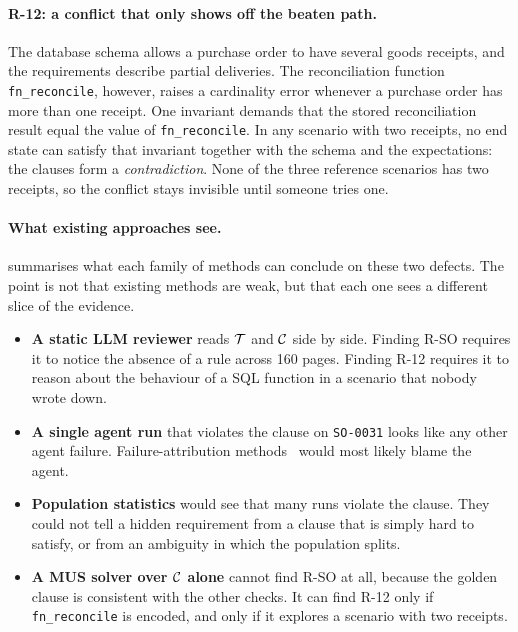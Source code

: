 \paragraph{R-12: a conflict that only shows off the beaten path.}
The database schema allows a purchase order to have several goods receipts, and the requirements describe partial deliveries. The reconciliation function \texttt{fn\_reconcile}, however, raises a cardinality error whenever a purchase order has more than one receipt. One invariant demands that the stored reconciliation result equal the value of \texttt{fn\_reconcile}. In any scenario with two receipts, no end state can satisfy that invariant together with the schema and the expectations: the clauses form a \emph{contradiction}. None of the three reference scenarios has two receipts, so the conflict stays invisible until someone tries one.

\paragraph{What existing approaches see.}
 summarises what each family of methods can conclude on these two defects. The point is not that existing methods are weak, but that each one sees a different slice of the evidence.
\begin{itemize}[leftmargin=*]
\item \textbf{A static LLM reviewer} reads $\mathcal{T}$ and $\mathcal{C}$ side by side. Finding R-SO requires it to notice the absence of a rule across 160 pages. Finding R-12 requires it to reason about the behaviour of a SQL function in a scenario that nobody wrote down.
\item \textbf{A single agent run} that violates the clause on \texttt{SO-0031} looks like any other agent failure. Failure-attribution methods~\cite{zhang2025which} would most likely blame the agent.
\item \textbf{Population statistics} would see that many runs violate the clause. They could not tell a hidden requirement from a clause that is simply hard to satisfy, or from an ambiguity in which the population splits.
\item \textbf{A MUS solver over $\mathcal{C}$ alone} cannot find R-SO at all, because the golden clause is consistent with the other checks. It can find R-12 only if \texttt{fn\_reconcile} is encoded, and only if it explores a scenario with two receipts.
\end{itemize}

